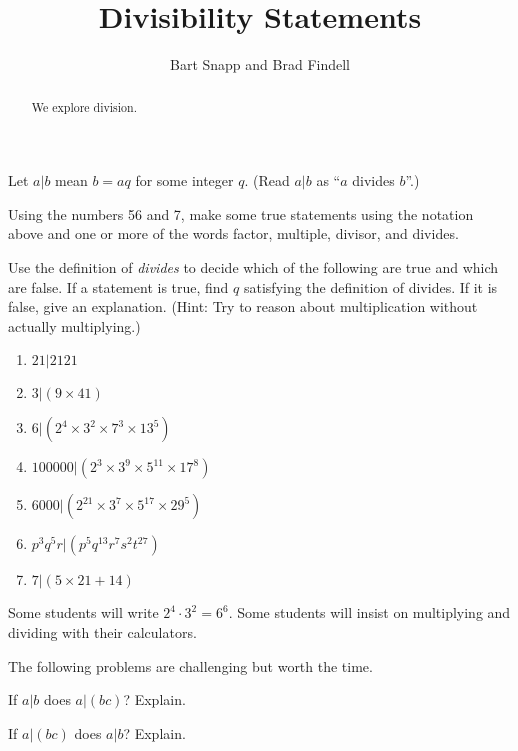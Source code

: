 \documentclass[nooutcomes]{ximera}
\title{Divisibility Statements}
\author{Bart Snapp and Brad Findell}
\begin{document}
\begin{abstract}
  We explore division.
\end{abstract}
\maketitle

\label{A:divisibilityStatements}

Let $a|b$ mean $b=aq$ for some integer $q$.  (Read $a|b$ as ``$a$ divides $b$''.)  

\begin{problem}
Using the numbers 56 and 7, make some true statements using the notation above and one or more of the words factor, multiple, divisor, and divides.  
\end{problem}

\begin{problem}
Use the definition of \emph{divides} to decide which of the following are true and which are false.  If a statement is true, find $q$ satisfying the definition of divides.  If it is false, give an explanation.  (Hint:  Try to reason about multiplication without actually multiplying.)
\begin{enumerate}
\item $21|2121$
\item $3|(9\times 41)$
\item $6|(2^4\times 3^2\times 7^3\times 13^5)$
\item $100000|(2^3\times 3^9\times 5^{11}\times 17^8)$
\item $6000|(2^{21}\times 3^7 \times 5^{17}\times 29^5)$
\item $p^3q^5r|(p^5q^{13}r^7s^2t^{27})$
\item $7|(5\times 21 + 14)$
\end{enumerate}
\end{problem}

\begin{teachingnote}
Some students will write $2^4\cdot 3^2=6^6$.  Some students will insist on multiplying and dividing with their calculators. 

The following problems are challenging but worth the time.
\end{teachingnote}

\begin{problem}
If $a|b$ does $a|(bc)$?  Explain. 
\end{problem}

\begin{problem}
If $a|(bc)$ does $a|b$?  Explain. 
\end{problem}
\end{document}

